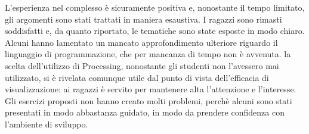 L'esperienza nel complesso è sicuramente positiva e, nonostante il tempo limitato, gli argomenti sono stati trattati in maniera esaustiva. I ragazzi sono rimasti soddisfatti e, da quanto riportato, le tematiche sono state esposte in modo chiaro. Alcuni hanno lamentato un mancato approfondimento ulteriore riguardo il linguaggio di programmazione, che per mancanza di tempo non è avvenuta. la scelta dell'utilizzo di Processing, nonostante gli studenti non l'avessero mai utilizzato, si è rivelata comunque utile dal punto di vista dell'efficacia di visualizzazione: ai ragazzi è servito per mantenere alta l'attenzione e l'interesse. Gli esercizi proposti non hanno creato molti problemi, perchè alcuni sono stati presentati in modo abbastanza guidato, in modo da prendere confidenza con l'ambiente di sviluppo. 
